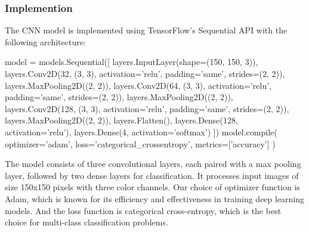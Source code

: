 \subsubsection{Implemention}
The CNN model is implemented using TensorFlow's Sequential API with the following architecture:
\vspace{0.3cm}
\begin{python}
model = models.Sequential([
    layers.InputLayer(shape=(150, 150, 3)), 
    layers.Conv2D(32, (3, 3), activation='relu', padding='same', strides=(2, 2)),
    layers.MaxPooling2D((2, 2)),
    layers.Conv2D(64, (3, 3), activation='relu', padding='same', strides=(2, 2)),
    layers.MaxPooling2D((2, 2)),
    layers.Conv2D(128, (3, 3), activation='relu', padding='same', strides=(2, 2)),
    layers.MaxPooling2D((2, 2)),
    layers.Flatten(),
    layers.Dense(128, activation='relu'),
    layers.Dense(4, activation='softmax')
])
model.compile(
    optimizer='adam',
    loss='categorical_crossentropy',
    metrics=['accuracy']
)
\end{python}

The model consists of three convolutional layers, each paired with a max pooling layer, followed by two dense layers for classification. 
It processes input images of size 150x150 pixels with three color channels.
Our choice of optimizer function is Adam, which is known for its efficiency and effectiveness in training deep learning models.
And the loss function is categorical cross-entropy, which is the best choice for multi-class classification problems.
